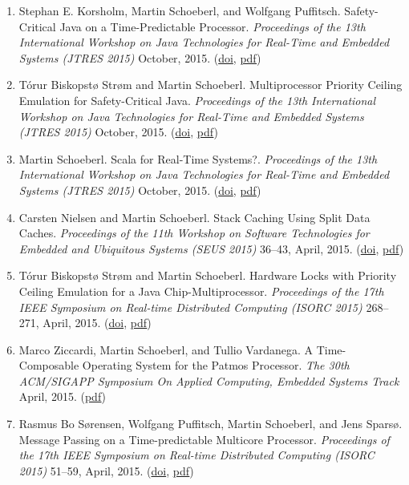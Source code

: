 \begin{enumerate}
\item Stephan E. Korsholm, Martin Schoeberl, and Wolfgang Puffitsch.
 Safety-Critical Java on a Time-Predictable Processor.
 \emph{Proceedings of the 13th International Workshop on Java Technologies for Real-Time and Embedded Systems (JTRES 2015)} October, 2015.
(\href{http://dx.doi.org/10.1145/2822304.2822309}{doi}, \href{http://www.jopdesign.com/doc/scjpat.pdf}{pdf})

\item T{\'o}rur Biskopst{\o} Str{\o}m and Martin Schoeberl.
 Multiprocessor Priority Ceiling Emulation for Safety-Critical Java.
 \emph{Proceedings of the 13th International Workshop on Java Technologies for Real-Time and Embedded Systems (JTRES 2015)} October, 2015.
(\href{http://dx.doi.org/10.1145/2822304.2822308}{doi}, \href{http://www.jopdesign.com/doc/joppce.pdf}{pdf})

\item Martin Schoeberl.
 Scala for Real-Time Systems?.
 \emph{Proceedings of the 13th International Workshop on Java Technologies for Real-Time and Embedded Systems (JTRES 2015)} October, 2015.
(\href{http://dx.doi.org/10.1145/2822304.2822313}{doi}, \href{http://www.jopdesign.com/doc/rtscala.pdf}{pdf})

\item Carsten Nielsen and Martin Schoeberl.
 Stack Caching Using Split Data Caches.
 \emph{Proceedings of the 11th Workshop on Software Technologies for Embedded and Ubiquitous Systems (SEUS 2015)} 36--43, April, 2015.
(\href{http://dx.doi.org/10.1109/ISORC.W20.21051.59.59}{doi}, \href{http://www.jopdesign.com/doc/scascache.pdf}{pdf})

\item T{\'o}rur Biskopst{\o} Str{\o}m and Martin Schoeberl.
 Hardware Locks with Priority Ceiling Emulation for a Java Chip-Multiprocessor.
 \emph{Proceedings of the 17th IEEE Symposium on Real-time Distributed Computing (ISORC 2015)} 268--271, April, 2015.
(\href{http://dx.doi.org/10.1109/ISORC.2015.33}{doi}, \href{http://www.jopdesign.com/doc/joppce-short.pdf}{pdf})

\item Marco Ziccardi, Martin Schoeberl, and Tullio Vardanega.
 A Time-Composable Operating System for the Patmos Processor.
 \emph{The 30th ACM/SIGAPP Symposium On Applied Computing, Embedded Systems Track} April, 2015.
(\href{http://www.jopdesign.com/doc/ospat.pdf}{pdf})

\item Rasmus Bo S{\o}rensen, Wolfgang Puffitsch, Martin Schoeberl, and Jens Spars{\o}.
 Message Passing on a Time-predictable Multicore Processor.
 \emph{Proceedings of the 17th IEEE Symposium on Real-time Distributed Computing (ISORC 2015)} 51--59, April, 2015.
(\href{http://dx.doi.org/10.1109/ISORC.2015.15}{doi}, \href{http://www.jopdesign.com/doc/rt-mpi.pdf}{pdf})


\end{enumerate}
